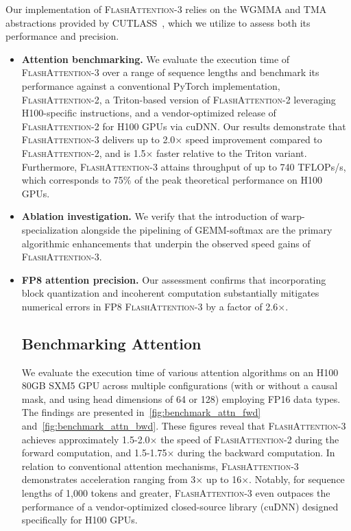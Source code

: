 Our implementation of \textsc{FlashAttention-3} relies on the WGMMA and TMA abstractions provided by CUTLASS~\citep{Thakkar_CUTLASS_2023}, which we utilize to assess both its performance and precision.

\begin{itemize}

\item \textbf{Attention benchmarking.} We evaluate the execution time of \textsc{FlashAttention-3} over a range of sequence lengths and benchmark its performance against a conventional PyTorch implementation, \textsc{FlashAttention-2}, a Triton-based version of \textsc{FlashAttention-2} leveraging H100-specific instructions, and a vendor-optimized release of \textsc{FlashAttention-2} for H100 GPUs via cuDNN. Our results demonstrate that \textsc{FlashAttention-3} delivers up to 2.0$\times$ speed improvement compared to \textsc{FlashAttention-2}, and is 1.5$\times$ faster relative to the Triton variant. Furthermore, \textsc{FlashAttention-3} attains throughput of up to 740 TFLOPs/s, which corresponds to 75\% of the peak theoretical performance on H100 GPUs.

\item \textbf{Ablation investigation.} We verify that the introduction of warp-specialization alongside the pipelining of GEMM-softmax are the primary algorithmic enhancements that underpin the observed speed gains of \textsc{FlashAttention-3}.

\item \textbf{FP8 attention precision.} Our assessment confirms that incorporating block quantization and incoherent computation substantially mitigates numerical errors in FP8 \textsc{FlashAttention-3} by a factor of 2.6$\times$.

\subsection{Benchmarking Attention}
\label{subsec:benchmark_attn}

We evaluate the execution time of various attention algorithms on an H100 80GB SXM5 GPU across multiple configurations (with or without a causal mask, and using head dimensions of 64 or 128) employing FP16 data types. The findings are presented in~\cref{fig:benchmark_attn_fwd} and~\cref{fig:benchmark_attn_bwd}. These figures reveal that \textsc{FlashAttention-3} achieves approximately 1.5-2.0$\times$ the speed of \textsc{FlashAttention-2} during the forward computation, and 1.5-1.75$\times$ during the backward computation. In relation to conventional attention mechanisms, \textsc{FlashAttention-3} demonstrates acceleration ranging from 3$\times$ up to 16$\times$. Notably, for sequence lengths of 1,000 tokens and greater, \textsc{FlashAttention-3} even outpaces the performance of a vendor-optimized closed-source library (cuDNN) designed specifically for H100 GPUs.


\end{itemize}
